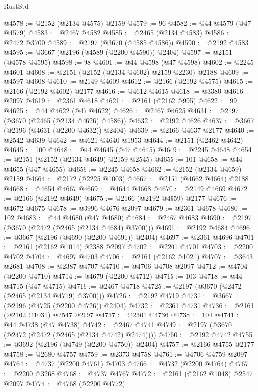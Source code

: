 \begin{lexlean}{RustStd}
\begin{coremodule}
@4578 := @2152 (@2134 @4575) @2159
@4579 := 96
@4582 := @44 @4579 (@47 @4579)
@4583 := @2467 @4582
@4585 := @2465 (@2134 @4583)
@4586 := @2472 @3700
@4589 := @2197 (@3670 (@4585 @4586))
@4590 := @2192 @4583
@4595 := @3667 (@2196 (@4589 (@2200 @4590)) @2404)
@4597 := @2151 (@4578 @4595)
@4598 := 98
@4601 := @44 @4598 (@47 @4598)
@4602 := @2245 @4601
@4608 := @2151 (@2152 (@2134 @4602) @2159 @2230) @2188
@4609 := @4597 @4608
@4610 := @2149 @4609
@4612 := @2166 (@2192 @4575)
@4615 := @2166 (@2192 @4602) @2177
@4616 := @4612 @4615
@4618 := @3380 @4616 @2097
@4619 := @2361 @4618
@4621 := @2161 (@2162 @995)
@4622 := 99
@4625 := @44 @4622 (@47 @4622)
@4626 := @2467 @4625
@4631 := @2197 (@3670 (@2465 (@2134 @4626) @4586))
@4632 := @2192 @4626
@4637 := @3667 (@2196 (@4631 (@2200 @4632)) @2404)
@4639 := @2166 @4637 @2177
@4640 := @2542 @4639
@4642 := @4621 @4640 @1953
@4644 := @2151 (@2462 @4642)
@4645 := 100
@4648 := @44 @4645 (@47 @4645)
@4649 := @2245 @4648
@4654 := @2151 (@2152 (@2134 @4649) @2159 @2545)
@4655 := 101
@4658 := @44 @4655 (@47 @4655)
@4659 := @2245 @4658
@4662 := @2152 (@2134 @4659) @2159
@4664 := @2172 (@2225 @1003)
@4667 := @2151 (@4662 @4664) @2188
@4668 := @4654 @4667
@4669 := @4644 @4668
@4670 := @2149 @4669
@4672 := @2166 (@2192 @4649)
@4675 := @2166 (@2192 @4659) @2177
@4676 := @4672 @4675
@4678 := @3996 @4676 @2097
@4679 := @2361 @4678
@4680 := 102
@4683 := @44 @4680 (@47 @4680)
@4684 := @2467 @4683
@4690 := @2197 (@3670 (@2472 (@2465 (@2134 @4684) @3700)))
@4691 := @2192 @4684
@4696 := @3667 (@2196 (@4690 (@2200 @4691)) @2404)
@4697 := @2361 @4696
@4701 := @2161 (@2162 @1014) @2388 @2097
@4702 := @2201 @4701
@4703 := @2200 @4702
@4704 := @4697 @4703
@4706 := @2161 (@2162 @1021)
@4707 := @3643 @2681
@4708 := @2387 @4707
@4710 := @4706 @4708 @2097
@4712 := @4704 (@2200 @4710)
@4714 := @4679 (@2200 @4712)
@4715 := 103
@4718 := @44 @4715 (@47 @4715)
@4719 := @2467 @4718
@4725 := @2197 (@3670 (@2472 (@2465 (@2134 @4719) @3700)))
@4726 := @2192 @4719
@4731 := @3667 (@2196 (@4725 (@2200 @4726)) @2404)
@4732 := @2361 @4731
@4736 := @2161 (@2162 @1031) @2547 @2097
@4737 := @2361 @4736
@4738 := 104
@4741 := @44 @4738 (@47 @4738)
@4742 := @2467 @4741
@4749 := @2197 (@3670 (@2472 (@2472 (@2465 (@2134 @4742) @2474))))
@4750 := @2192 @4742
@4755 := @3692 (@2196 (@4749 (@2200 @4750)) @2404)
@4757 := @2166 @4755 @2177
@4758 := @2680 @4757
@4759 := @2373 @4758
@4761 := @4706 @4759 @2097
@4764 := @4737 (@2200 @4761) @4703
@4766 := @4732 (@2200 @4764)
@4767 := @2200 @3268
@4768 := @4737 @4767
@4772 := @2161 (@2162 @1048) @2547 @2097
@4774 := @4768 (@2200 @4772)

\end{coremodule}
\end{lexlean}
